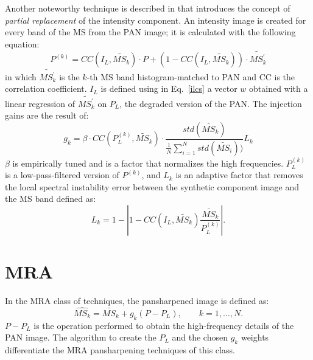 \documentclass[12pt]{report}
\begin{document}
Another noteworthy technique is described in \cite{cs7} that introduces the concept of 
\textit{partial replacement } of the intensity component. An intensity
image is created  for every band of the MS from the PAN image; it is calculated with the following equation:
%
\begin{equation}
    P^{(k)} = CC(I_L, \widetilde{MS_k}) \cdot P + (1 - CC(I_L, \widetilde{MS_k})) \cdot 
    \widetilde{MS_k^{'}}
    \label{pk}
\end{equation}
%
in which $\widetilde{MS_k^{'}}$ is the $k$-th MS band histogram-matched to PAN and CC is the
correlation coefficient.
$I_L$ is defined using in Eq.~\ref{ilcs} a vector $w$  obtained with a linear regression of $\widetilde{MS_k^{'}}$
on $P_L$, the degraded version of the PAN.
The injection gains are the result of:
%
\begin{equation}
    g_k = \beta \cdot CC(P_L^{(k)}, \widetilde{MS_k}) \cdot 
    \frac{std(\widetilde{MS_k})}{\frac{1}{N}\sum_{i=1}^N std(\widetilde{MS_i}))} L_k
    \label{gkpk}
\end{equation}
%
$\beta$ is empirically tuned and is a factor that normalizes the high frequencies.
$P_L^{(k)}$ is a low-pass-filtered version of  $P^{(k)}$,  and $L_k$ is an adaptive factor 
that removes the local spectral instability error between the synthetic component image 
and the MS band defined as:
%
\begin{equation}
    L_k = 1 - |1 - CC(I_L, \widetilde{MS_k})\frac{\widetilde{MS_k}}{P_L^{(k)}}|.
    \label{lk}
\end{equation}
%

\section{MRA}

In the MRA class of techniques, the pansharpened image is defined as:
%
\begin{equation}
    \widehat{MS_k} = \widetilde{MS_k} + g_k(P - P_L), \qquad k = 1,\dots,N. 
    \label{mra}
\end{equation}
%
$P - P_L$  is the operation performed to obtain the high-frequency details of the PAN image. 
The algorithm to create the $P_L$ and the chosen $g_k$ weights differentiate the MRA 
pansharpening techniques of this class.
\end{document}
